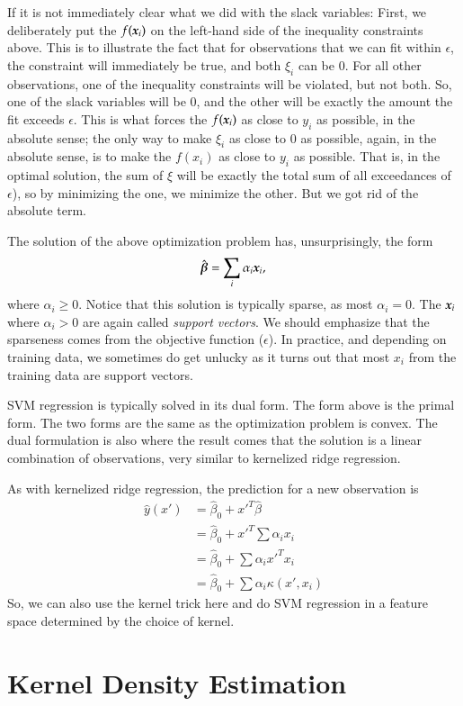 \begin{refsection}
If it is not immediately clear what we did with the slack variables: First, we deliberately put the  $f(\boldsymbol{x}_i)$ on the left-hand side of the inequality constraints above. This is to illustrate the fact that for observations that we can fit within $\epsilon$, the constraint will immediately be true, and both $\xi_i$ can be 0. For all other observations, one of the inequality constraints will be violated, but not both. So, one of the slack variables will be 0, and the other will be exactly the amount the fit exceeds $\epsilon$. This is what forces the $f(\boldsymbol{x}_i)$ as close to $y_i$ as possible, in the absolute sense; the only way to make $\xi_i$ as close to 0 as possible, again, in the absolute sense, is to make the $f(x_i)$ as close to $y_i$ as possible. That is, in the optimal solution, the sum of $\xi$ will be exactly the total sum of all exceedances of $\epsilon$), so by minimizing the one, we minimize the other. But we got rid of the absolute term.

The solution of the above optimization problem \citep{2012-Murphy} has, unsurprisingly, the form
$$\hat{\boldsymbol{\beta}} = \sum_i \alpha_i \boldsymbol{x}_i,$$
%
where $\alpha_i \geq 0$. Notice that this solution is typically sparse, as most $\alpha_i = 0$. The $\boldsymbol{x}_i$ where $\alpha_i > 0$ are again called \emph{support vectors}. We should emphasize that the sparseness comes from the objective function ($\epsilon$). In practice, and depending on training data, we sometimes do get unlucky as it turns out that most $x_i$ from the training data are support vectors.

SVM regression is typically solved in its dual form. The form above is the primal form. The two forms are the same as the optimization problem is convex. The dual formulation is also where the result comes that the solution is a linear combination of observations, very similar to kernelized ridge regression.

As with kernelized ridge regression, the prediction for a new observation is
\begin{align*}
\hat{y}(x') & = \hat{\beta}_0 + x'^T\hat{\beta} \\
& = \hat{\beta}_0 + x'^T\sum \alpha_i x_i \\
& = \hat{\beta}_0 + \sum \alpha_i x'^Tx_i \\
& =  \hat{\beta}_0 + \sum \alpha_i \kappa(x', x_i)
\end{align*}
So, we can also use the kernel trick here and do SVM regression in a feature space determined by the choice of kernel.

\section*{Kernel Density Estimation}


\end{refsection}
